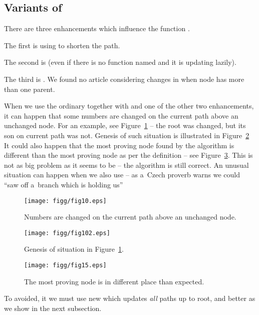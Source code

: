 \subsection{Variants of }

There are three enhancements which influence the function . 

The first is using  to shorten the path. 

The second is  (even if there is no function named  and it is
		updating lazily).

The third is . We found no article
considering changes in  when node has more than one parent.

When we use the ordinary  together with
 and one of the other two enhancements, it can happen
that some numbers are changed on the current path above an unchanged node. For
an example, see Figure~\ref{deset} -- the root was changed, but its son on
current path was not. Genesis of such situation is illustrated in
Figure~\ref{desetvznik} It could also happen that the most proving node found
by the algorithm is different than the most proving node as per the definition
-- see Figure~\ref{patnact}. This is not as big problem as it seems to be --
the algorithm is still correct. An unusual situation can happen when we also
use  -- as a~Czech proverb warns we could ``saw
off a~branch which is holding us''


\begin{figure}
\centerline{\mbox{\texttt{[image: figg/fig10.eps]}}}
\caption{Numbers are changed on the current path above an unchanged node.}
\label{deset}
\end{figure}


\begin{figure}
\centerline{\mbox{\texttt{[image: figg/fig102.eps]}}}
\caption{Genesis of situation in Figure~\ref{deset}.}
\label{desetvznik}
\end{figure}

\begin{figure}
\centerline{\mbox{\texttt{[image: figg/fig15.eps]}}}
\caption{The most proving node is in different place than expected.}
\label{patnact}
\end{figure}


To avoided, it we must use new  which updates \emph{all}
paths up to root, and better  as we show in the next
subsection. 


